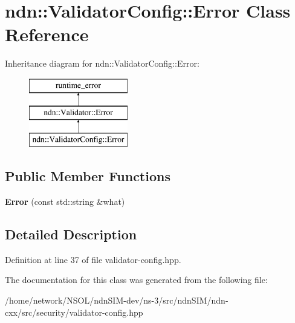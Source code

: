 \hypertarget{classndn_1_1ValidatorConfig_1_1Error}{}\section{ndn\+:\+:Validator\+Config\+:\+:Error Class Reference}
\label{classndn_1_1ValidatorConfig_1_1Error}
Inheritance diagram for ndn\+:\+:Validator\+Config\+:\+:Error\+:\begin{figure}[H]
\begin{center}
\leavevmode
\includegraphics[height=3.000000cm]{classndn_1_1ValidatorConfig_1_1Error}
\end{center}
\end{figure}
\subsection*{Public Member Functions}
\begin{DoxyCompactItemize}
\item 
{\bfseries Error} (const std\+::string \&what)\hypertarget{classndn_1_1ValidatorConfig_1_1Error_a6dcbb0941d10c5eb0bf8e736836293a0}{}\label{classndn_1_1ValidatorConfig_1_1Error_a6dcbb0941d10c5eb0bf8e736836293a0}

\end{DoxyCompactItemize}


\subsection{Detailed Description}


Definition at line 37 of file validator-\/config.\+hpp.



The documentation for this class was generated from the following file\+:\begin{DoxyCompactItemize}
\item 
/home/network/\+N\+S\+O\+L/ndn\+S\+I\+M-\/dev/ns-\/3/src/ndn\+S\+I\+M/ndn-\/cxx/src/security/validator-\/config.\+hpp\end{DoxyCompactItemize}
